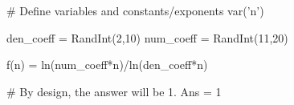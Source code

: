 \begin{sagesilent}
# Define variables and constants/exponents
var('n')

den_coeff = RandInt(2,10)
num_coeff = RandInt(11,20)

f(n) = ln(num_coeff*n)/ln(den_coeff*n)

# By design, the answer will be 1.
Ans = 1

\end{sagesilent}

